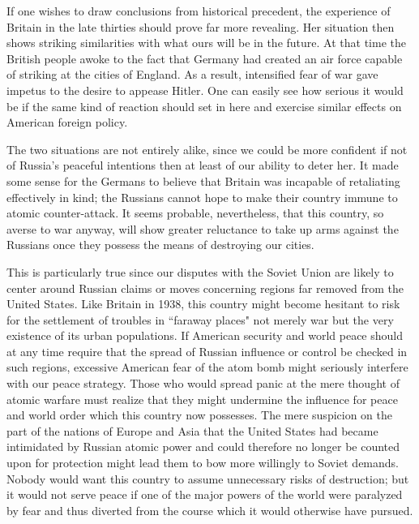 If one wishes to draw conclusions from historical precedent, the experience of Britain in the late thirties should prove far more revealing. Her situation then shows striking similarities with what ours will be in the future. At that time the British people awoke to the fact that Germany had created an air force capable of striking at the cities of England. As a result, intensified fear of war gave impetus to the desire to appease Hitler. One can easily see how serious it would be if the same kind of reaction should set in here and exercise similar effects on American foreign policy.

The two situations are not entirely alike, since we could be more confident if not of Russia's peaceful intentions then at least of our ability to deter her. It made some sense for the Germans to believe that Britain was incapable of retaliating effectively in kind; the Russians cannot hope to make their country immune to atomic counter-attack. It seems probable, nevertheless, that this country, so averse to war anyway, will show greater reluctance to take up arms against the Russians once they possess the means of destroying our cities.

This is particularly true since our disputes with the Soviet Union are likely to center around Russian claims or moves concerning regions far removed from the United States. Like Britain in 1938, this country might become hesitant to risk for the settlement of troubles in ``faraway places" not merely war but the very existence of its urban populations. If American security and world peace should at any time require that the spread of Russian influence or control be checked in such regions, excessive American fear of the atom bomb might seriously interfere with our peace strategy. Those who would spread panic at the mere thought of atomic warfare must realize that they might undermine the influence for peace and world order which this country now possesses. The mere suspicion on the part of the nations of Europe and Asia that the United States had became intimidated by Russian atomic power and could therefore no longer be counted upon for protection might lead them to bow more willingly to Soviet demands. Nobody would want this country to assume unnecessary risks of destruction; but it would not serve peace if one of the major powers of the world were paralyzed by fear and thus diverted from the course which it would otherwise have pursued.

